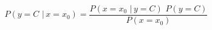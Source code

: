 \documentclass{article}
\begin{document}
\begin{equation} \label{eq:2-2}
P(y=C  \,\, | \, x=x_0) = \frac{P(x=x_0  \,\, | \, y=C) \,\,P(y=C)}{P(x=x_0)}
\end{equation}
\end{document}

